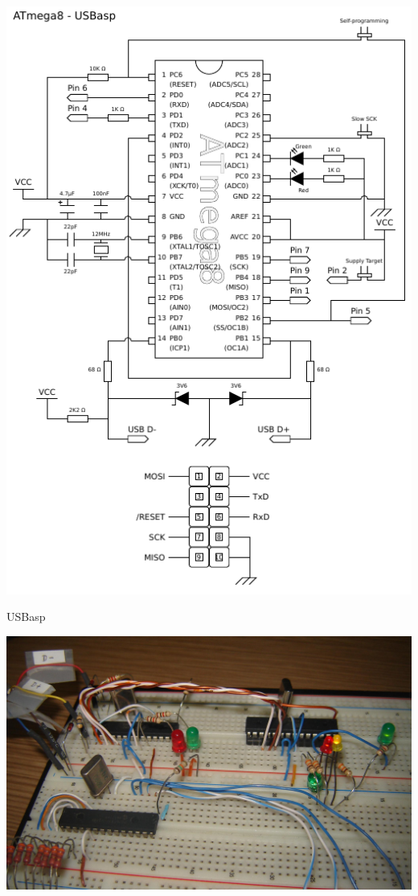 \documentclass{beamer}
\begin{document}
\begin{frame}[plain]
	\begin{center}
		\includegraphics[keepaspectratio, width=1.0\textwidth, height=1.0\textheight, clip, trim=0.00in 1.10in 0.00in 0.00in]{img/AVR-USBasp.pdf}
	\end{center}
\end{frame}


\begin{frame}{USBasp}
	\begin{center}
		\includegraphics[keepaspectratio, width=1.0\textwidth, height=0.8\textheight, clip, trim=0.00in 5.75in 0.00in 0.00in]{img/usbasp_on_breadboard_2_hi.jpg}
	\end{center}
\end{frame}
\end{document}
